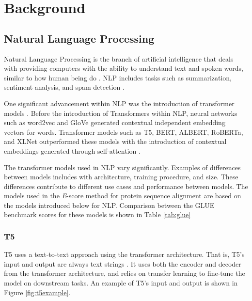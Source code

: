 \chapter{Background}
\section{Natural Language Processing}
Natural Language Processing is the branch of artificial intelligence that deals with providing computers with the ability to understand text and spoken words, similar to how human being do \cite{Khurana:2023}. \gls{NLP} includes tasks such as summarization, sentiment analysis, and spam detection \cite{Khurana:2023}.

One significant advancement within \gls{NLP} was the introduction of \gls{transformer} models \cite{Vaswani:2017}. Before the introduction of Transformers within NLP, neural networks such as word2vec \cite{Mikolov:2013} and GloVe \cite{Pennington:2014} generated contextual independent embedding vectors for words. Transformer models such as T5, BERT, ALBERT, RoBERTa, and XLNet outperformed these models with the introduction of contextual embeddings generated through self-attention \cite{Vaswani:2017}.

The \gls{transformer} models used in \gls{NLP} vary significantly. Examples of differences between models includes with architecture, training procedure, and size. These differences contribute to different use cases and performance between models. The models used in the \textit{E}-score method for protein sequence alignment are based on the models introduced below for NLP. Comparison between the GLUE benchmark scores for these models is shown in Table \ref{tab:glue}

\subsection{T5}
\gls{T5} uses a text-to-text approach using the \gls{transformer} architecture. That is, T5's input and output are always text strings \cite{Raffel:2020}. It uses both the encoder and decoder from the transformer architecture, and relies on \gls{transfer learning} to fine-tune the model on downstream tasks. An example of T5's input and output is shown in Figure \ref{fig:t5example}.

